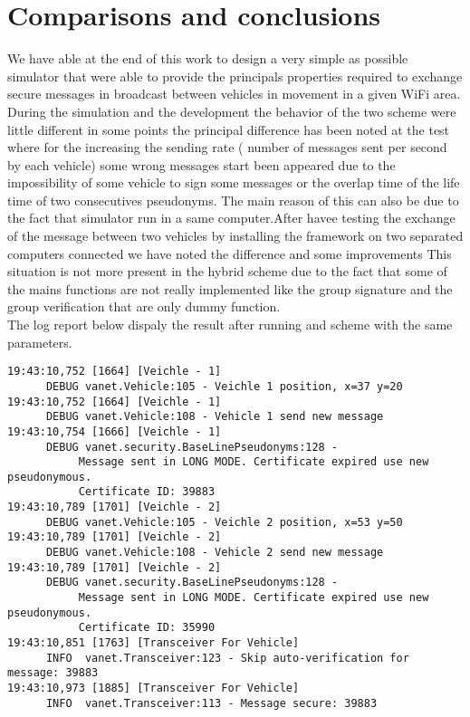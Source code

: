 \section{Comparisons and conclusions}
We have able at the end of this work to design a very simple as possible simulator that were able to provide the principals properties required to exchange secure messages in broadcast between vehicles in movement in a given WiFi area.    
During the simulation and the development the behavior of the two scheme were little different in some points the principal difference has been noted at the test where for the \baseline increasing the sending rate ( number of messages sent per  second by each vehicle) some wrong messages start been appeared due to the impossibility of some vehicle to sign some messages or the overlap time of the life time of two consecutives pseudonyms. The main reason of this can also be due to the fact that simulator run in a same computer.After havee testing the exchange of the message between two vehicles by installing the framework on two separated computers connected we have noted the difference and some improvements
This situation is not more present in the hybrid scheme due to the fact that some of the mains functions are not really implemented like the group signature and the group verification that are only dummy function.\\

The log report below dispaly the result after running \baseline and \hybrid scheme with the same parameters.
\baseline
\begin{verbatim}
19:43:10,752 [1664] [Veichle - 1] 
      DEBUG vanet.Vehicle:105 - Veichle 1 position, x=37 y=20
19:43:10,752 [1664] [Veichle - 1] 
      DEBUG vanet.Vehicle:108 - Vehicle 1 send new message
19:43:10,754 [1666] [Veichle - 1] 
      DEBUG vanet.security.BaseLinePseudonyms:128 - 
           Message sent in LONG MODE. Certificate expired use new pseudonymous. 
           Certificate ID: 39883
19:43:10,789 [1701] [Veichle - 2] 
      DEBUG vanet.Vehicle:105 - Veichle 2 position, x=53 y=50
19:43:10,789 [1701] [Veichle - 2] 
      DEBUG vanet.Vehicle:108 - Vehicle 2 send new message
19:43:10,789 [1701] [Veichle - 2] 
      DEBUG vanet.security.BaseLinePseudonyms:128 - 
           Message sent in LONG MODE. Certificate expired use new pseudonymous. 
           Certificate ID: 35990
19:43:10,851 [1763] [Transceiver For Vehicle] 
      INFO  vanet.Transceiver:123 - Skip auto-verification for message: 39883
19:43:10,973 [1885] [Transceiver For Vehicle] 
      INFO  vanet.Transceiver:113 - Message secure: 39883
\end{verbatim}

